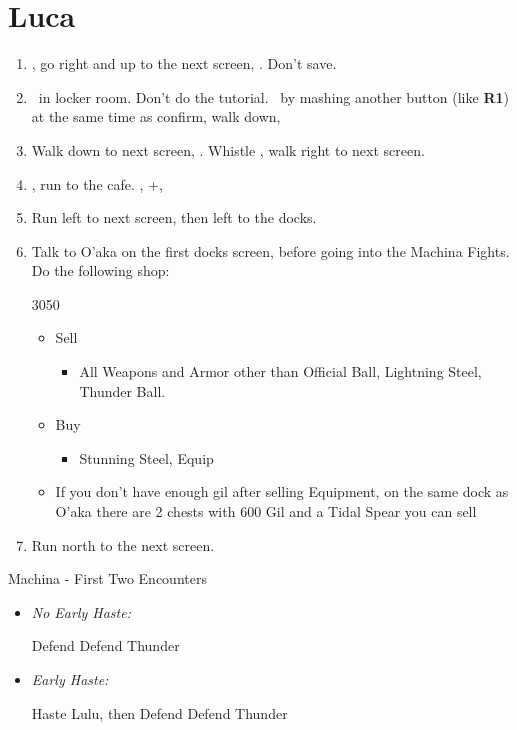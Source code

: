 \chapter{Luca}

\begin{enumerate}
    \item \sd, go right and up to the next screen, \cs[2:30]. Don't save.
    \item \sd\ in locker room. Don't do the tutorial. \sd\ by mashing another button (like \textbf{R1}) at the same time as confirm, walk down, \sd
    \item Walk down to next screen, \sd. Whistle \cs[0:30], walk right to next screen.
    \item \sd, run to the cafe. \sd, \skippablefmv+\cs[1:20], \sd
    \item Run left to next screen, then left to the docks.
    \item Talk to O'aka on the first docks screen, before going into the Machina Fights. Do the following shop:
    \begin{shop}{3050}
        \begin{itemize}
            \item Sell
            \begin{itemize}
                \item All Weapons and Armor other than Official Ball, Lightning Steel, Thunder Ball.
            \end{itemize}
            \item Buy
            \begin{itemize}
                \item Stunning Steel, Equip
            \end{itemize}
            \item If you don't have enough gil after selling Equipment, on the same dock as O'aka there are 2 chests with 600 Gil and a Tidal Spear you can sell
        \end{itemize}
    \end{shop}
    \item Run north to the next screen.
\end{enumerate}
\begin{battle}{Machina - First Two Encounters}
    \begin{itemize}
        \item \textit{No Early Haste:}
        \begin{itemize}
            \tidusf Defend
            \kimahrif Defend
            \luluf Thunder
        \end{itemize}
        \item \textit{Early Haste:}
        \begin{itemize}
            \tidusf Haste Lulu, then Defend
            \kimahrif Defend
            \luluf Thunder
        \end{itemize}
    \end{itemize}
\end{battle}
